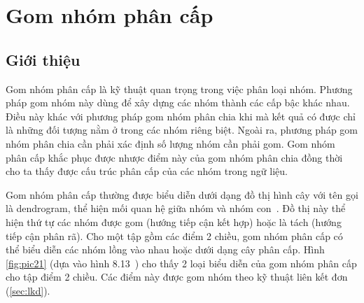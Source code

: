 \chapter{Gom nhóm phân cấp}
\label{Chapter2}

\section{Giới thiệu}
Gom nhóm phân cấp là kỹ thuật quan trọng trong việc phân loại nhóm. Phương pháp gom nhóm này dùng để xây dựng các nhóm thành các cấp bậc khác nhau.
Điều này khác với phương pháp gom nhóm phân chia khi mà kết quả có được chỉ là những đối tượng nằm ở trong các nhóm riêng biệt.
Ngoài ra, phương pháp gom nhóm phân chia cần phải xác định số lượng nhóm cần phải gom.
Gom nhóm phân cấp khắc phục được nhược điểm này của gom nhóm phân chia đồng thời cho ta thấy được cấu trúc phân cấp của các nhóm trong ngữ liệu.

Gom nhóm phân cấp thường được biểu diễn dưới dạng đồ thị hình cây với tên gọi là dendrogram, thể hiện mối quan hệ giữa nhóm và nhóm con~\cite{Vipin-Kumar}.
Đồ thị này thể hiện thứ tự các nhóm được gom (hướng tiếp cận kết hợp) hoặc là tách (hướng tiếp cận phân rã). 
Cho một tập gồm các điểm 2 chiều, gom nhóm phân cấp có thể biểu diễn các nhóm lồng vào nhau hoặc dưới dạng cây phân cấp.
Hình \ref{fig:pic21} (dựa vào hình 8.13~\cite{Vipin-Kumar}) cho thấy 2 loại biểu diễn của gom nhóm phân cấp cho tập điểm 2 chiều.
Các điểm này được gom nhóm theo kỹ thuật liên kết đơn (\ref{sec:lkd}).

